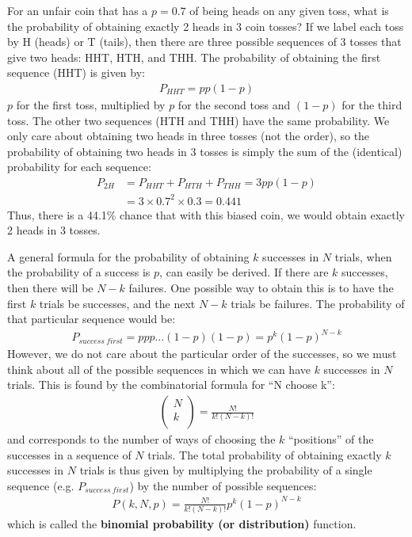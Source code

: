 \begin{example}{}{For an unfair coin that has a $p=0.7$ of being heads on any given toss, what is the probability of obtaining exactly 2 heads in 3 coin tosses?}{}
If we label each toss by H (heads) or T (tails), then there are three possible sequences of 3 tosses that give two heads: HHT, HTH, and THH. The probability of obtaining the first sequence (HHT) is given by:
\begin{align*}
P_{HHT}=pp(1-p)
\end{align*} 
$p$ for the first toss, multiplied by $p$ for the second toss and $(1-p)$ for the third toss. The other two sequences (HTH and THH) have the same probability. We only care about obtaining two heads in three tosses (not the order), so the probability of obtaining two heads in 3 tosses is simply the sum of the (identical) probability for each sequence:
\begin{align*}
P_{2H}&=P_{HHT}+P_{HTH}+P_{THH}=3pp(1-p)\\
&=3\times0.7^2\times0.3=0.441
\end{align*}
Thus, there is a 44.1\% chance that with this biased coin, we would obtain exactly 2 heads in 3 tosses.
\end{example}

A general formula for the probability of obtaining $k$ successes in $N$ trials, when the probability of a success is $p$, can easily be derived.  If there are $k$ successes, then there will be $N-k$ failures. One possible way to obtain this is to have the first $k$ trials be successes, and the next $N-k$ trials be failures. The probability of that particular sequence would be:
\begin{align*}
P_{success\: first}=ppp\dots(1-p)(1-p)=p^k(1-p)^{N-k}
\end{align*}
However, we do not care about the particular order of the successes, so we must think about all of the possible sequences in which we can have $k$ successes in $N$ trials. This is found by the combinatorial formula for ``N choose k'':
\begin{align*}
\left(
\begin{array}{c}
N\\
k\\
\end{array}
\right)=\frac{N!}{k!(N-k)!}
\end{align*}
and corresponds to the number of ways of choosing the $k$ ``positions'' of the successes in a sequence of $N$ trials. The total probability of obtaining exactly $k$ successes in $N$ trials is thus given by multiplying the probability of a single sequence (e.g. $P_{success\: first}$) by the number of possible sequences:
\begin{align}
P(k,N,p)=\frac{N!}{k!(N-k)!}p^k(1-p)^{N-k}
\end{align}
which is called the \textbf{binomial probability (or distribution)} function.

